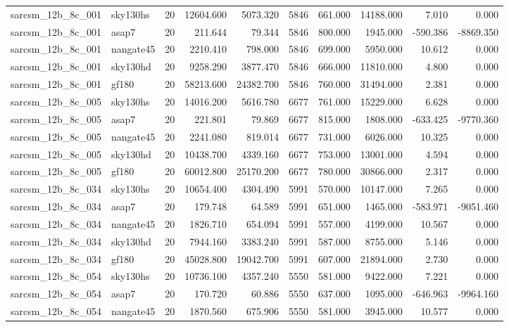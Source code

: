 \documentclass{article}
\begin{document}
\begin{longtable}{llrrrrrrrr}
sarcsm\_12b\_8c\_001 & sky130hs & 20 & 12604.600 & 5073.320 & 5846 & 661.000 & 14188.000 & 7.010 & 0.000 \\
sarcsm\_12b\_8c\_001 & asap7 & 20 & 211.644 & 79.344 & 5846 & 800.000 & 1945.000 & -590.386 & -8869.350 \\
sarcsm\_12b\_8c\_001 & nangate45 & 20 & 2210.410 & 798.000 & 5846 & 699.000 & 5950.000 & 10.612 & 0.000 \\
sarcsm\_12b\_8c\_001 & sky130hd & 20 & 9258.290 & 3877.470 & 5846 & 666.000 & 11810.000 & 4.800 & 0.000 \\
sarcsm\_12b\_8c\_001 & gf180 & 20 & 58213.600 & 24382.700 & 5846 & 760.000 & 31494.000 & 2.381 & 0.000 \\
sarcsm\_12b\_8c\_005 & sky130hs & 20 & 14016.200 & 5616.780 & 6677 & 761.000 & 15229.000 & 6.628 & 0.000 \\
sarcsm\_12b\_8c\_005 & asap7 & 20 & 221.801 & 79.869 & 6677 & 815.000 & 1808.000 & -633.425 & -9770.360 \\
sarcsm\_12b\_8c\_005 & nangate45 & 20 & 2241.080 & 819.014 & 6677 & 731.000 & 6026.000 & 10.325 & 0.000 \\
sarcsm\_12b\_8c\_005 & sky130hd & 20 & 10438.700 & 4339.160 & 6677 & 753.000 & 13001.000 & 4.594 & 0.000 \\
sarcsm\_12b\_8c\_005 & gf180 & 20 & 60012.800 & 25170.200 & 6677 & 780.000 & 30866.000 & 2.317 & 0.000 \\
sarcsm\_12b\_8c\_034 & sky130hs & 20 & 10654.400 & 4304.490 & 5991 & 570.000 & 10147.000 & 7.265 & 0.000 \\
sarcsm\_12b\_8c\_034 & asap7 & 20 & 179.748 & 64.589 & 5991 & 651.000 & 1465.000 & -583.971 & -9051.460 \\
sarcsm\_12b\_8c\_034 & nangate45 & 20 & 1826.710 & 654.094 & 5991 & 557.000 & 4199.000 & 10.567 & 0.000 \\
sarcsm\_12b\_8c\_034 & sky130hd & 20 & 7944.160 & 3383.240 & 5991 & 587.000 & 8755.000 & 5.146 & 0.000 \\
sarcsm\_12b\_8c\_034 & gf180 & 20 & 45028.800 & 19042.700 & 5991 & 607.000 & 21894.000 & 2.730 & 0.000 \\
sarcsm\_12b\_8c\_054 & sky130hs & 20 & 10736.100 & 4357.240 & 5550 & 581.000 & 9422.000 & 7.221 & 0.000 \\
sarcsm\_12b\_8c\_054 & asap7 & 20 & 170.720 & 60.886 & 5550 & 637.000 & 1095.000 & -646.963 & -9964.160 \\
sarcsm\_12b\_8c\_054 & nangate45 & 20 & 1870.560 & 675.906 & 5550 & 581.000 & 3945.000 & 10.577 & 0.000 \\

\end{longtable}
\end{document}
